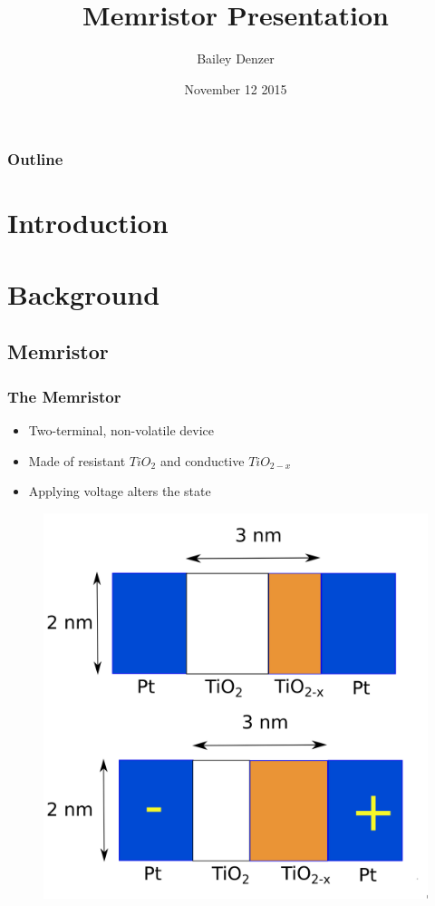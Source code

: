 \documentclass{beamer}
\begin{document}
\title{Memristor Presentation}
\author{Bailey Denzer}
\date[]  
{November 12 2015}

\begin{frame}
  \titlepage
\end{frame}

\begin{frame}

  \frametitle{Outline}
\tableofcontents
\end{frame}

\section{Introduction}

\section{Background}

\subsection{Memristor}

\begin{frame}
  \frametitle{The Memristor}
  
\begin{itemize}
\item Two-terminal, non-volatile device 
\item Made of resistant $TiO_{2}$ and conductive $TiO_{2-x}$
\item Applying voltage alters the state
\end{itemize}
  
\begin{figure}
\includegraphics[height=45mmh]{memristor.png}
\end{figure}
\end{frame}
\end{document}
